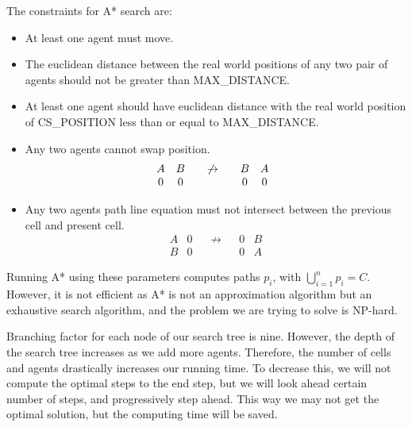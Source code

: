 The constraints for A* search are:
\begin{itemize}
	\item At least one agent must move.
	\item The euclidean distance between the real world positions of any two pair of agents should not be greater than MAX\_DISTANCE.
	\item At least one agent should have euclidean distance with the real world position of CS\_POSITION less than or equal to MAX\_DISTANCE.
	\item Any two agents cannot swap position. $$\begin{matrix} \label{eq:swap_agent}
	A & B && \not\to && B & A\\
	0 & 0 && && 0 & 0
	\end{matrix} \\
	$$
	
	\item Any two agents path line equation must not intersect between the previous cell and present cell. $$
	\begin{matrix} \label{eq:intersect_agent}
	A & 0 && \not\to && 0 & B\\
	B & 0 &&&& 0 & A
	\end{matrix}
	$$
\end{itemize}

Running A* using these parameters computes paths $p_i$, with $\bigcup\limits_{i=1}^{n} p_i = C$. However, it is not efficient as A* is not an approximation algorithm but an exhaustive search algorithm, and the problem we are trying to solve is NP-hard.

Branching factor for each node of our search tree is nine. However, the depth of the search tree increases as we add more agents. Therefore, the number of cells and agents drastically increases our running time. To decrease this, we will not compute the optimal steps to the end step, but we will look ahead certain number of steps, and progressively step ahead. This way we may not get the optimal solution, but the computing time will be saved. 

